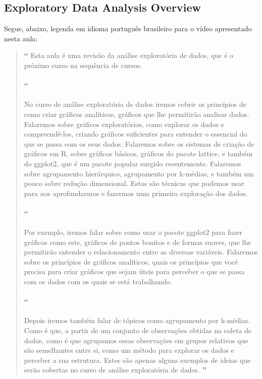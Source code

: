 \subsection{Exploratory Data Analysis Overview}

Segue, abaixo, legenda em idioma português brasileiro para o vídeo apresentado nesta aula:

\begin{quotation}%
\begin{small}
{\large\textbf{``}}%
Esta aula é uma revisão da análise exploratória de dados, que é o próximo curso na sequência de cursos. 

\paragraph{``}
No curso de análise exploratória de dados iremos cobrir os princípios  de como criar gráficos analíticos, gráficos que lhe permitirão analisar dados. Falaremos sobre gráficos exploratórios, como explorar os dados e compreendê-los, criando gráficos suficientes para entender o essencial do que se passa com os seus dados. Falaremos sobre os sistemas de criação de gráficos em R, sobre gráficos básicos, gráficos do pacote lattice,  e também do ggplot2, que é um pacote popular surgido recentemente. Falaremos sobre agrupamento hierárquico, agrupamento por k-médias, e também um pouco sobre redução dimensional. Estas são técnicas que podemos usar  para nos aprofundarmos e fazermos uma primeira exploração dos dados. 

\paragraph{``}
Por exemplo, iremos falar sobre como usar o pacote ggplot2 para fazer gráficos como este,  gráficos de pontos bonitos e de formas suaves, que lhe permitirão entender o relacionamento entre as diversas variáveis. Falaremos sobre os princípios de gráficos analíticos, quais os princípios que você precisa para criar gráficos que sejam úteis para perceber  o que se passa com os dados com os quais se está trabalhando. 

\paragraph{``}
Depois iremos também falar de tópicos como agrupamento por k-médias. Como é que, a partir de um conjunto de observações obtidas na coleta de dados, como é que agrupamos essas observações  em grupos relativos que são semelhantes entre si, como um método para explorar os dados e perceber a sua estrutura. Estes são apenas alguns exemplos de ideias que serão cobertas no curso de análise exploratória de dados. 
{\large\textbf{''}}
\end{small}
\end{quotation}


